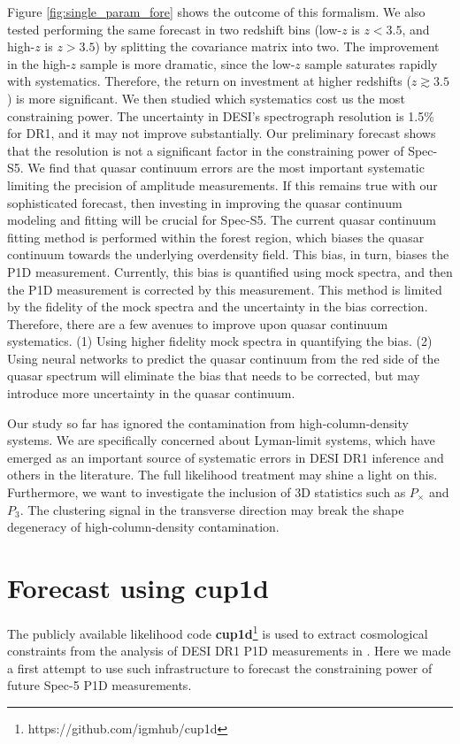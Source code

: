 Figure \ref{fig:single_param_fore} shows the outcome of this formalism. We also tested performing the same forecast in two redshift bins (low-$z$ is $z<3.5$, and high-$z$ is $z>3.5$) by splitting the covariance matrix into two. The improvement in the high-$z$ sample is more dramatic, since the low-$z$ sample saturates rapidly with systematics. Therefore, the return on investment at higher redshifts ($z\gtrsim 3.5$) is more significant. We then studied which systematics cost us the most constraining power. The uncertainty in DESI's spectrograph resolution is 1.5\% for DR1, and it may not improve substantially. Our preliminary forecast shows that the resolution is not a significant factor in the constraining power of Spec-S5. We find that quasar continuum errors are the most important systematic limiting the precision of amplitude measurements. If this remains true with our sophisticated forecast, then investing in improving the quasar continuum modeling and fitting will be crucial for Spec-S5. The current quasar continuum fitting method is performed within the forest region, which biases the quasar continuum towards the underlying overdensity field. This bias, in turn, biases the P1D measurement. Currently, this bias is quantified using mock spectra, and then the P1D measurement is corrected by this measurement. This method is limited by the fidelity of the mock spectra and the uncertainty in the bias correction. Therefore, there are a few avenues to improve upon quasar continuum systematics. (1) Using higher fidelity mock spectra in quantifying the bias. (2) Using neural networks to predict the quasar continuum from the red side of the quasar spectrum will eliminate the bias that needs to be corrected, but may introduce more uncertainty in the quasar continuum.

Our study so far has ignored the contamination from high-column-density systems. We are specifically concerned about Lyman-limit systems, which have emerged as an important source of systematic errors in DESI DR1 inference and others in the literature. The full likelihood treatment may shine a light on this. Furthermore, we want to investigate the inclusion of 3D statistics such as $P_\times$ and $P_\mathrm{3}$. The clustering signal in the transverse direction may break the shape degeneracy of high-column-density contamination.


\section{Forecast using cup1d}
The  publicly available likelihood code {\bf{cup1d}}\footnote{https://github.com/igmhub/cup1d} is used to extract cosmological constraints from the analysis of DESI
DR1 P1D measurements in \cite{}. Here we made a first attempt to use such infrastructure to forecast the constraining power of future Spec-5 P1D measurements. 


